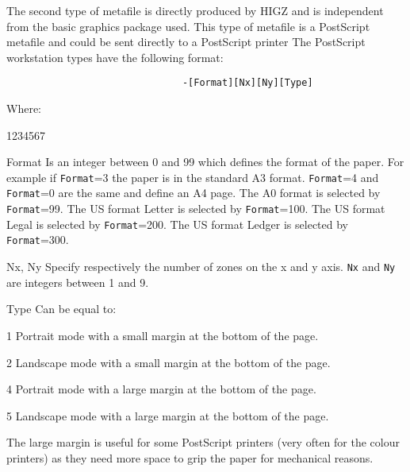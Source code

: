 The second type of metafile is directly produced by HIGZ and is independent 
from the basic graphics package used. This type of metafile is a 
PostScript metafile and could be sent directly to a PostScript printer
The PostScript workstation types have the following format:
\begin{verbatim}
                               -[Format][Nx][Ny][Type]
\end{verbatim}
    Where:
\begin{DLtt}{1234567}
\item[Format] Is an integer between 0 and 99 which defines the format of the
              paper. For example if \texttt{Format}=3 the paper is in the standard
              A3 format. \texttt{Format}=4 and \texttt{Format}=0 are the same and
              define an A4 page. The A0 format is selected by \texttt{Format}=99.
              The US format Letter is selected by \texttt{Format}=100.
              The US format Legal is selected by \texttt{Format}=200.
              The US format Ledger is selected by \texttt{Format}=300.
\item[Nx, Ny] Specify respectively the number of zones on the x and y axis.
              \texttt{Nx} and \texttt{Ny} are integers between 1 and 9.
\item[Type] Can be equal to:
\begin{DLtt}{12}
\item[1] Portrait mode with a small margin at the bottom of the page.
\item[2] Landscape mode with a small margin at the bottom of the page.
\item[4] Portrait mode with a large margin at the bottom of the page.
\item[5] Landscape mode with a large margin at the bottom of the page.

The large margin is useful for some PostScript printers (very often for the 
colour printers)  as they need more space to
grip the paper for mechanical reasons.


\end{DLtt}
\end{DLtt}
